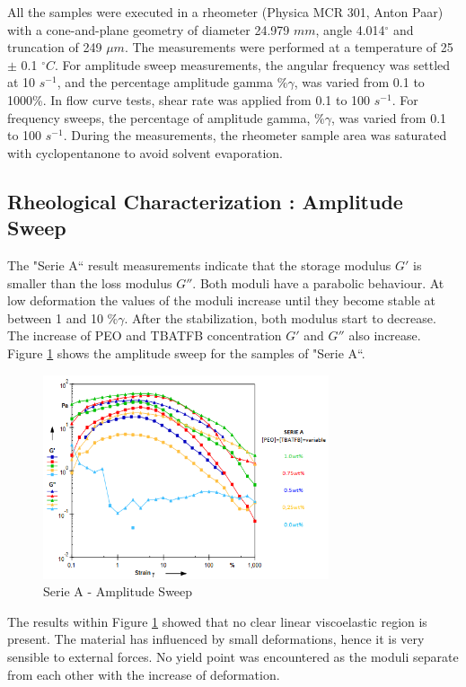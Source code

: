 All the samples were executed in a rheometer (Physica MCR 301, Anton Paar) with a cone-and-plane geometry of diameter 24.979 $m m$, angle 4.014$^\circ$ and truncation of 249 $\mu m$. The measurements were performed at a temperature of 25 $\pm$ 0.1 $^\circ C$. For amplitude sweep measurements, the angular frequency was settled at 10 $s^{-1}$, and the percentage amplitude gamma $\% \gamma$, was varied from 0.1 to 1000\%. In flow curve tests, shear rate was applied from 0.1 to 100 $s^{-1}$. For frequency sweeps, the percentage of amplitude gamma, $\% \gamma$, was varied from 0.1 to 100 $s^{-1}$. During the measurements, the rheometer sample area was saturated with cyclopentanone to avoid solvent evaporation.

\subsection{Rheological Characterization : \textbf{Amplitude Sweep}}
The "Serie A`` result measurements indicate that the storage modulus $G'$ is smaller than the loss modulus $G''$. Both moduli have a parabolic behaviour. At low deformation the values of the moduli increase until they become stable at between 1 and 10 $\% \gamma$. After the stabilization, both modulus start to decrease. The increase of PEO and TBATFB concentration $G'$ and $G''$ also increase. Figure \ref{fig:SerieAampSweep} shows the amplitude sweep for the samples of "Serie A``.

\begin{figure}[th]
\centering
\includegraphics[width=0.75\textwidth]{./Figures/SerieAampSweep.png}
\decoRule
\caption[Serie A - Amplitude Sweep]{Serie A - Amplitude Sweep}
\label{fig:SerieAampSweep}
\end{figure}

The results within Figure \ref{fig:SerieAampSweep} showed that no clear linear viscoelastic region is present. The material has influenced by small deformations, hence it is very sensible to external forces. No yield point was encountered as the moduli separate from each other with the increase of deformation.

